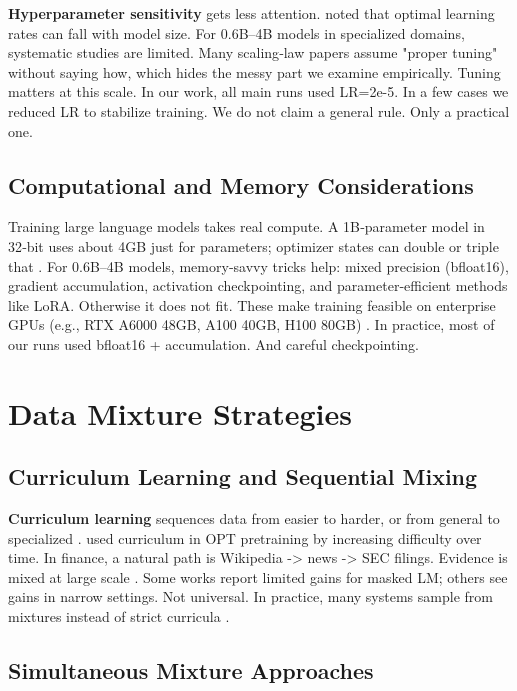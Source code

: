 \textbf{Hyperparameter sensitivity} gets less attention. \textcite{mccandlish2018empirical} noted that optimal learning rates can fall with model size. For 0.6B--4B models in specialized domains, systematic studies are limited. Many scaling‑law papers assume "proper tuning" without saying how, which hides the messy part we examine empirically. Tuning matters at this scale. In our work, all main runs used LR=2e-5. In a few cases we reduced LR to stabilize training. We do not claim a general rule. Only a practical one.

\subsection{Computational and Memory Considerations}

Training large language models takes real compute. A 1B‑parameter model in 32‑bit uses about 4GB just for parameters; optimizer states can double or triple that \parencite{rajbhandari2020zero,kingma2014adam}. For 0.6B--4B models, memory‑savvy tricks help: mixed precision (bfloat16), gradient accumulation, activation checkpointing, and parameter‑efficient methods like LoRA. Otherwise it does not fit. These make training feasible on enterprise GPUs (e.g., RTX A6000 48GB, A100 40GB, H100 80GB) \parencite{narayanan2021efficient,hu2021lora}. In practice, most of our runs used bfloat16 + accumulation. And careful checkpointing.

\section{Data Mixture Strategies}

\subsection{Curriculum Learning and Sequential Mixing}

\textbf{Curriculum learning} sequences data from easier to harder, or from general to specialized \parencite{bengio2009curriculum}. \textcite{wu2022opt} used curriculum in OPT pretraining by increasing difficulty over time. In finance, a natural path is Wikipedia -> news -> SEC filings. Evidence is mixed at large scale \parencite{longpre2023pretrainer}. Some works report limited gains for masked LM; others see gains in narrow settings. Not universal. In practice, many systems sample from mixtures instead of strict curricula \parencite{raffel2020exploring,wu2022opt}.

\subsection{Simultaneous Mixture Approaches}


